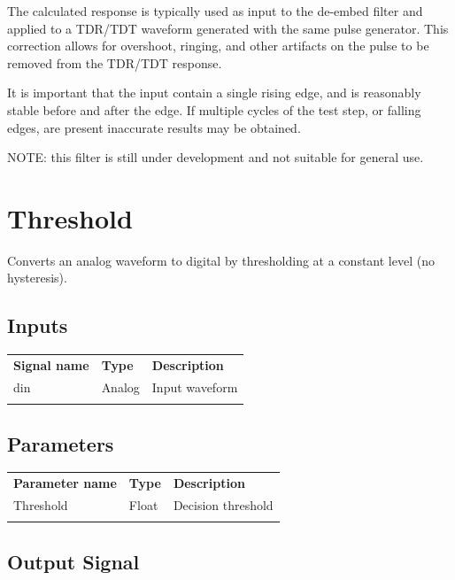 The calculated response is typically used as input to the de-embed filter and applied to a TDR/TDT waveform generated
with the same pulse generator. This correction allows for overshoot, ringing, and other artifacts on the pulse to be
removed from the TDR/TDT response.

It is important that the input contain a single rising edge, and is reasonably stable before and after the edge.
If multiple cycles of the test step, or falling edges, are present inaccurate results may be obtained.

NOTE: this filter is still under development and not suitable for general use.

\pagebreak
\section{Threshold}

Converts an analog waveform to digital by thresholding at a constant level (no hysteresis).

\subsection{Inputs}

\begin{tabularx}{16cm}{llX}
\thickhline
\textbf{Signal name} & \textbf{Type} & \textbf{Description} \\
\thickhline
din & Analog & Input waveform \\
\thickhline
\end{tabularx}

\subsection{Parameters}

\begin{tabularx}{16cm}{llX}
\thickhline
\textbf{Parameter name} & \textbf{Type} & \textbf{Description} \\
\thickhline
Threshold & Float & Decision threshold \\
\thickhline
\end{tabularx}

\subsection{Output Signal}

